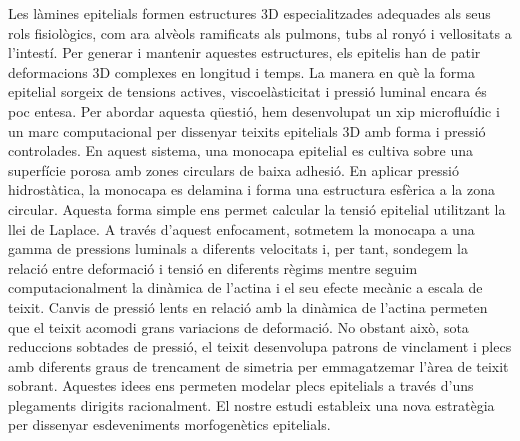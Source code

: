 \begin{Abstractcat}
	
	Les làmines epitelials formen estructures 3D especialitzades adequades als seus rols fisiològics, com ara alvèols ramificats als pulmons, tubs al ronyó i vellositats a l'intestí. Per generar i mantenir aquestes estructures, els epitelis han de patir deformacions 3D complexes en longitud i temps. La manera en què la forma epitelial sorgeix de tensions actives, viscoelàsticitat i pressió luminal encara és poc entesa. Per abordar aquesta qüestió, hem desenvolupat un xip microfluídic i un marc computacional per dissenyar teixits epitelials 3D amb forma i pressió controlades. En aquest sistema, una monocapa epitelial es cultiva sobre una superfície porosa amb zones circulars de baixa adhesió. En aplicar pressió hidrostàtica, la monocapa es delamina i forma una estructura esfèrica a la zona circular. Aquesta forma simple ens permet calcular la tensió epitelial utilitzant la llei de Laplace. A través d'aquest enfocament, sotmetem la monocapa a una gamma de pressions luminals a diferents velocitats i, per tant, sondegem la relació entre deformació i tensió en diferents règims mentre seguim computacionalment la dinàmica de l'actina i el seu efecte mecànic a escala de teixit. Canvis de pressió lents en relació amb la dinàmica de l'actina permeten que el teixit acomodi grans variacions de deformació. No obstant això, sota reduccions sobtades de pressió, el teixit desenvolupa patrons de vinclament i plecs amb diferents graus de trencament de simetria per emmagatzemar l'àrea de teixit sobrant. Aquestes idees ens permeten modelar plecs epitelials a través d'uns plegaments dirigits racionalment. El nostre estudi estableix una nova estratègia per dissenyar esdeveniments morfogenètics epitelials.
	
\end{Abstractcat}